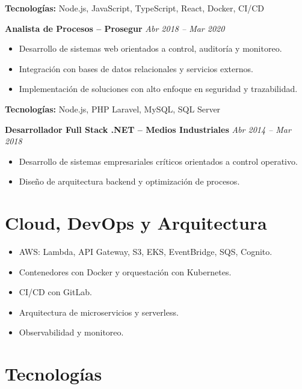 \documentclass[11pt,a4paper]{article}
\begin{document}
\textbf{Tecnologías:} Node.js, JavaScript, TypeScript, React, Docker, CI/CD

\vspace{12pt}

\textbf{Analista de Procesos – Prosegur} \hfill \textit{Abr 2018 – Mar 2020}
\begin{itemize}[leftmargin=*]
  \item Desarrollo de sistemas web orientados a control, auditoría y monitoreo.
  \item Integración con bases de datos relacionales y servicios externos.
  \item Implementación de soluciones con alto enfoque en seguridad y trazabilidad.
\end{itemize}

\textbf{Tecnologías:} Node.js, PHP Laravel, MySQL, SQL Server

\vspace{12pt}

\textbf{Desarrollador Full Stack .NET – Medios Industriales} \hfill \textit{Abr 2014 – Mar 2018}
\begin{itemize}[leftmargin=*]
  \item Desarrollo de sistemas empresariales críticos orientados a control operativo.
  \item Diseño de arquitectura backend y optimización de procesos.
\end{itemize}

\vspace{6pt}

\section*{Cloud, DevOps y Arquitectura}

\begin{itemize}[leftmargin=*]
  \item AWS: Lambda, API Gateway, S3, EKS, EventBridge, SQS, Cognito.
  \item Contenedores con Docker y orquestación con Kubernetes.
  \item CI/CD con GitLab.
  \item Arquitectura de microservicios y serverless.
  \item Observabilidad y monitoreo.
\end{itemize}

\vspace{6pt}

\section*{Tecnologías}
\end{document}
